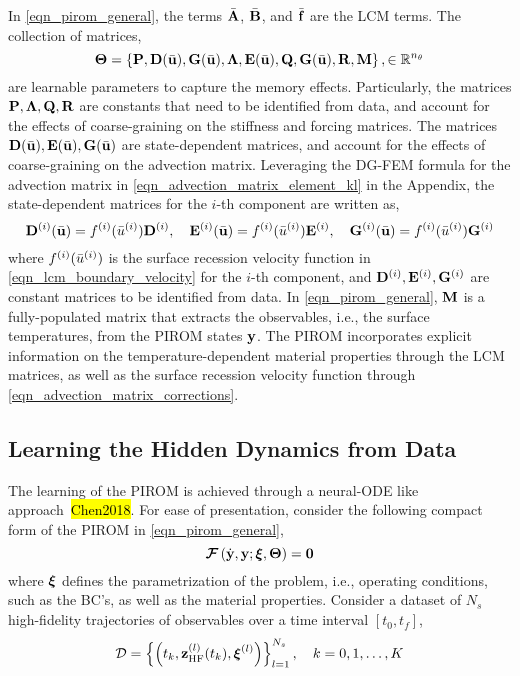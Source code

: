 In \cref{eqn_pirom_general}, the terms $\bar{\mathbf{A}}$, $\bar{\mathbf{B}}$, and $\bar{\mathbf{f}}$ are the LCM terms. The collection of matrices,
\begin{equation}
    \boldsymbol{\Theta} = \left\{\mathbf{P},\mathbf{D}(\bar{\mathbf{u}}),\mathbf{G}(\bar{\mathbf{u}}),\boldsymbol{\Lambda},\mathbf{E}(\bar{\mathbf{u}}),\mathbf{Q},\mathbf{G}(\bar{\mathbf{u}}),\mathbf{R},\mathbf{M}\right\},\in\mathbb{R}^{n_{\theta}}
\end{equation}
are learnable parameters to capture the memory effects. Particularly, the matrices $\mathbf{P},\boldsymbol{\Lambda},\mathbf{Q},\mathbf{R}$ are constants that need to be identified from data, and account for the effects of coarse-graining on the stiffness and forcing matrices. The matrices $\mathbf{D}(\bar{\mathbf{u}}),\mathbf{E}(\bar{\mathbf{u}}),\mathbf{G}(\bar{\mathbf{u}})$ are state-dependent matrices, and account for the effects of coarse-graining on the advection matrix. Leveraging the DG-FEM formula for the advection matrix in \cref{eqn_advection_matrix_element_kl} in the Appendix, the state-dependent matrices for the $i$-th component are written as,
\begin{equation}
    \mathbf{D}^{(i)}(\bar{\mathbf{u}}) = f^{(i)}(\bar{u}^{(i)})\mathbf{D}^{(i)}, \quad \mathbf{E}^{(i)}(\bar{\mathbf{u}}) = f^{(i)}(\bar{u}^{(i)})\mathbf{E}^{(i)}, \quad \mathbf{G}^{(i)}(\bar{\mathbf{u}}) = f^{(i)}(\bar{u}^{(i)})\mathbf{G}^{(i)}\label{eqn_advection_matrix_corrections}
\end{equation}
where $f^{(i)}(\bar{u}^{(i)})$ is the surface recession velocity function in \cref{eqn_lcm_boundary_velocity} for the $i$-th component, and $\mathbf{D}^{(i)},\mathbf{E}^{(i)},\mathbf{G}^{(i)}$ are constant matrices to be identified from data. In \cref{eqn_pirom_general}, $\mathbf{M}$ is a fully-populated matrix that extracts the observables, i.e., the surface temperatures, from the PIROM states $\mathbf{y}$. The PIROM incorporates explicit information on the temperature-dependent material properties through the LCM matrices, as well as the surface recession velocity function through \cref{eqn_advection_matrix_corrections}.

\subsection{Learning the Hidden Dynamics from Data}

The learning of the PIROM is achieved through a neural-ODE like approach~\hl{Chen2018}. For ease of presentation, consider the following compact form of the PIROM in \cref{eqn_pirom_general},
\begin{equation}
    \boldsymbol{\mathcal{F}}\left(\dot{\mathbf{y}},\mathbf{y};\boldsymbol{\xi},\boldsymbol{\Theta}\right) = \boldsymbol{0}\label{eqn_pirom_compact}
\end{equation}
where $\boldsymbol{\xi}$ defines the parametrization of the problem, i.e., operating conditions, such as the BC's, as well as the material properties. Consider a dataset of $N_s$ high-fidelity trajectories of observables over a time interval $[t_0,t_f]$,
\begin{equation}
    \mathcal{D} = \left\{\left(t_k,\mathbf{z}^{(l)}_{\text{HF}}(t_k),\boldsymbol{\xi}^{(l)}\right)\right\}_{l=1}^{N_s},\quad k=0,1,\dots,K
\end{equation}

